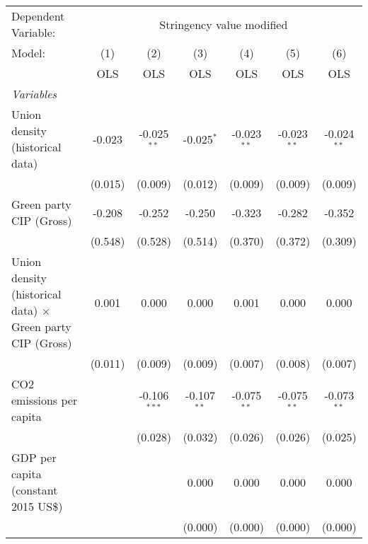 
\begingroup
\centering
\begin{tabular}{lcccccc}
   \toprule
   Dependent Variable: & \multicolumn{6}{c}{Stringency value modified}\\
   Model:                                                            & (1)     & (2)            & (3)           & (4)           & (5)           & (6)\\  
                                                                     &  OLS    & OLS            & OLS           & OLS           & OLS           & OLS\\  
   \midrule
   \emph{Variables}\\
   Union density (historical data)                                   & -0.023  & -0.025$^{**}$  & -0.025$^{*}$  & -0.023$^{**}$ & -0.023$^{**}$ & -0.024$^{**}$\\   
                                                                     & (0.015) & (0.009)        & (0.012)       & (0.009)       & (0.009)       & (0.009)\\   
   Green party CIP (Gross)                                           & -0.208  & -0.252         & -0.250        & -0.323        & -0.282        & -0.352\\   
                                                                     & (0.548) & (0.528)        & (0.514)       & (0.370)       & (0.372)       & (0.309)\\   
   Union density (historical data) $\times$ Green party CIP (Gross)  & 0.001   & 0.000          & 0.000         & 0.001         & 0.000         & 0.000\\   
                                                                     & (0.011) & (0.009)        & (0.009)       & (0.007)       & (0.008)       & (0.007)\\   
   CO2 emissions per capita                                          &         & -0.106$^{***}$ & -0.107$^{**}$ & -0.075$^{**}$ & -0.075$^{**}$ & -0.073$^{**}$\\   
                                                                     &         & (0.028)        & (0.032)       & (0.026)       & (0.026)       & (0.025)\\   
   GDP per capita (constant 2015 US\$)                               &         &                & 0.000         & 0.000         & 0.000         & 0.000\\   
                                                                     &         &                & (0.000)       & (0.000)       & (0.000)       & (0.000)\\   

\end{tabular}
